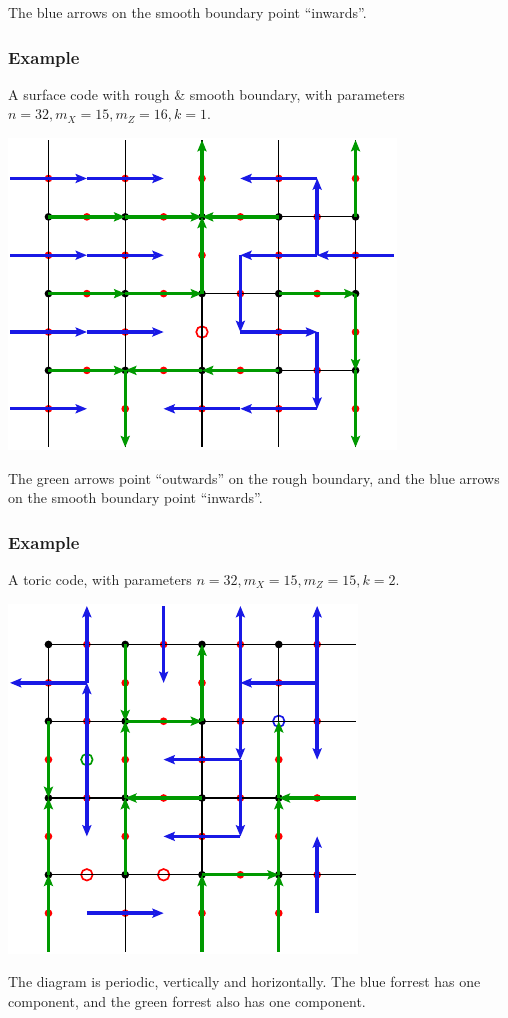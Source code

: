 \documentclass[11pt,oneside]{article}
\begin{document}
The blue arrows on the smooth boundary point ``inwards''.

\subsubsection{Example}

A surface code with rough \& smooth boundary,
with parameters $n=32, m_X=15, m_Z=16, k=1.$

\begin{center}
\includegraphics[]{pic-surface.pdf}
\end{center}

The green arrows point ``outwards'' on the rough boundary,
and the blue arrows on the smooth boundary point ``inwards''.


\subsubsection{Example}

A toric code,
with parameters $n=32, m_X=15, m_Z=15, k=2.$

\begin{center}
\includegraphics[]{pic-torus.pdf}
\end{center}

The diagram is periodic, vertically and horizontally.
The blue forrest has one component, and the
green forrest also has one component.





{}

\end{document}
